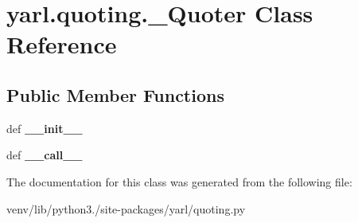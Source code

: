 \hypertarget{classyarl_1_1quoting_1_1___quoter}{}\section{yarl.\+quoting.\+\_\+\+Quoter Class Reference}
\label{classyarl_1_1quoting_1_1___quoter}
\subsection*{Public Member Functions}
\begin{DoxyCompactItemize}
\item 
\mbox{\label{classyarl_1_1quoting_1_1___quoter_a47f81a3be7a89fa9fda56a3af79a48ba}} 
def {\bfseries \+\_\+\+\_\+init\+\_\+\+\_\+}
\item 
\mbox{\label{classyarl_1_1quoting_1_1___quoter_a7846915c5d873282496db829cc5f9d8e}} 
def {\bfseries \+\_\+\+\_\+call\+\_\+\+\_\+}
\end{DoxyCompactItemize}


The documentation for this class was generated from the following file\+:\begin{DoxyCompactItemize}
\item 
venv/lib/python3./site-\/packages/yarl/quoting.\+py\end{DoxyCompactItemize}
